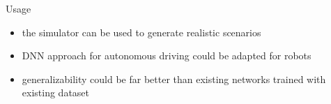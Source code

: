 \documentclass{beamer}
\begin{document}
\begin{frame}{Usage}
    \begin{itemize}
        \item the simulator can be used to generate realistic scenarios
        \vfill
        \item DNN approach for autonomous driving could be adapted for robots
        \vfill
        \item generalizability could be far better than existing networks trained
              with existing dataset
    \end{itemize}
\end{frame}
\end{document}
